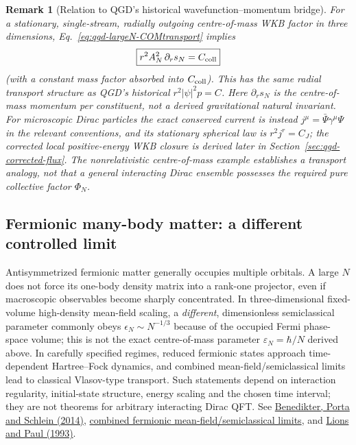 \documentclass[11pt,a4paper]{article}
\newtheorem{remark}{Remark}[section]
\begin{document}
\begin{remark}[Relation to QGD's historical wavefunction--momentum bridge]
\label{rem:qgd-largeN-QGDflux}
For a \emph{stationary, single-stream, radially outgoing} centre-of-mass WKB factor in three dimensions, Eq.~\eqref{eq:qgd-largeN-COMtransport} implies
\begin{equation}\label{eq:qgd-largeN-COMflux}
\boxed{r^2A_N^2\,\partial_rs_N=C_{\rm coll}}
\end{equation}
(with a constant mass factor absorbed into $C_{\rm coll}$). This has the same radial transport structure as QGD's historical $r^2|\psi|^2p=C$. Here $\partial_rs_N$ is the \emph{centre-of-mass momentum per constituent}, not a derived gravitational natural invariant. For microscopic Dirac particles the exact conserved current is instead $j^\mu=\bar\Psi\gamma^\mu\Psi$ in the relevant conventions, and its stationary spherical law is $r^2j^r=C_J$; the corrected local positive-energy WKB closure is derived later in Section~\ref{sec:qgd-corrected-flux}. The nonrelativistic centre-of-mass example establishes a transport analogy, not that a general interacting Dirac ensemble possesses the required pure collective factor $\Phi_N$.
\end{remark}

\subsection{Fermionic many-body matter: a different controlled limit}
\label{subsec:qgd-largeN-fermions}
Antisymmetrized fermionic matter generally occupies multiple orbitals. A large $N$ does not force its one-body density matrix into a rank-one projector, even if macroscopic observables become sharply concentrated. In three-dimensional fixed-volume high-density mean-field scaling, a \emph{different}, dimensionless semiclassical parameter commonly obeys $\epsilon_N\sim N^{-1/3}$ because of the occupied Fermi phase-space volume; this is not the exact centre-of-mass parameter $\varepsilon_N=\hbar/N$ derived above. In carefully specified regimes, reduced fermionic states approach time-dependent Hartree--Fock dynamics, and combined mean-field/semiclassical limits lead to classical Vlasov-type transport. Such statements depend on interaction regularity, initial-state structure, energy scaling and the chosen time interval; they are not theorems for arbitrary interacting Dirac QFT. See \href{https://doi.org/10.1007/s00220-014-2031-z}{Benedikter, Porta and Schlein (2014)}, \href{https://doi.org/10.1007/s10955-021-02700-w}{combined fermionic mean-field/semiclassical limits}, and \href{https://doi.org/10.4171/RMI/143}{Lions and Paul (1993)}.
\end{document}
